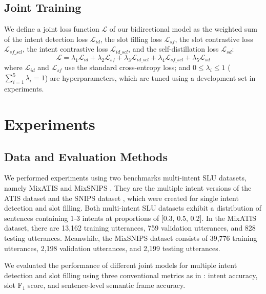 \documentclass{ecai}
\begin{document}
\subsection{Joint Training}
We define a joint loss function $\mathcal{L}$ of our bidirectional model as the weighted sum of the intent detection loss $\mathcal{L}_{id}$, the slot filling loss $\mathcal{L}_{sf}$, the slot contrastive loss $\mathcal{L}_{sf\_{scl}}$, the intent contrastive loss $\mathcal{L}_{id\_{scl}}$, and the self-distillation loss $\mathcal{L}_{sd}$:  
$$\mathcal{L}=  \lambda_1 \mathcal{L}_{id} + \lambda_2 \mathcal{L}_{sf} + \lambda_3 \mathcal{L}_{id\_scl} + \lambda_4 \mathcal{L}_{sf\_scl} + \lambda_5 \mathcal{L}_{sd}$$
where $\mathcal{L}_{id}$ and $\mathcal{L}_{sf}$ use the standard cross-entropy loss; and $0 \leq \lambda_i \leq 1$ ($\sum_{i=1}^5{\lambda_i} = 1$) are hyperparameters, which are tuned using a development set in experiments.

\section{Experiments}
\subsection{Data and Evaluation Methods}
We performed experiments using two benchmarks multi-intent SLU datasets, namely MixATIS and MixSNIPS \cite{qin:2020}. They are the multiple intent versions of the ATIS dataset \cite{Hemphill:1990} and the SNIPS dataset \cite{Coucke:2018}, which were created for single intent detection and slot filling. Both multi-intent SLU datasets exhibit a distribution of sentences containing 1-3 intents at proportions of [0.3, 0.5, 0.2]. In the MixATIS dataset, there are 13,162 training utterances, 759 validation utterances, and 828 testing utterances. Meanwhile, the MixSNIPS dataset consists of 39,776 training utterances, 2,198 validation utterances, and 2,199 testing utterances.

We evaluated the performance of different joint models for multiple intent detection and slot filling using three conventional metrics as in \cite{gangadharaiah-narayanaswamy:2019}: intent accuracy, slot F$_1$ score, and sentence-level semantic frame accuracy. 
\end{document}
